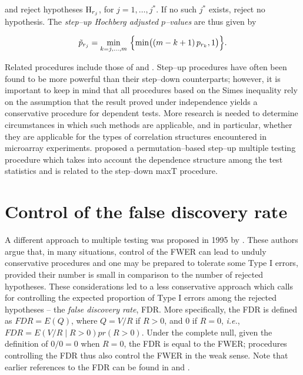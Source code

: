 \documentclass[11pt]{article}
\newcommand{\scst}{\scriptstyle}
\begin{document}
and reject hypotheses ${\rm H}_{\scst r_j}$, for $j=1,\ldots,j^*$. If no such $j^*$ exists, reject no hypothesis. The {\it step--up Hochberg adjusted $p$--values} are thus given by 

\begin{equation}\label{ehoch}
\tilde{p}_{\scst r_j} = \min_{k = j,\ldots, m}\ \Bigl\{ \min \bigl( (m-k+1) \, p_{\scst r_k},1 \bigr) \Bigr\}.
\end{equation}

Related procedures include those of \cite{Hommel88} and \cite{Rom90}. Step--up procedures have often been found to be more powerful than their step--down counterparts; however, it is important to keep in mind that all procedures based on the Simes inequality rely on the assumption that the result proved under independence yields a conservative procedure for dependent tests. More research is needed to determine circumstances in which such methods are applicable, and in particular, whether they are applicable for the types of correlation structures encountered in microarray experiments. \cite{Troendle96} proposed a permutation--based step--up multiple testing procedure which takes into account the dependence structure among the test statistics and is related to the \cite{Westfall&Young93} step--down maxT procedure.



\section{Control of the false discovery rate}\label{sFDR}

A different approach to multiple testing was proposed in 1995 by
\cite{Benjamini&Hochberg95}. These authors argue that, in many
situations, control of the FWER can lead to unduly conservative
procedures and one may be prepared to tolerate some Type I
errors, provided their number is small in comparison to the number of
rejected hypotheses. These considerations led to a less conservative
approach which calls for controlling the expected proportion of Type I
errors among the rejected hypotheses -- the {\it false discovery rate},
FDR. More specifically, the FDR is defined as $FDR = E(Q)$, where $Q =
V/R$ if $R >0$, and $0$ if $R=0$, {\it i.e.}, $FDR = E(V/R \mid
R>0)pr(R>0)$. Under the complete null, given the definition of $0/0 =
0$ when $R=0$, the FDR is equal to the FWER;  procedures
controlling the FDR thus also control the FWER in the weak sense. Note that
earlier references to the FDR can be found in \cite{Seeger68} and \cite{Soric89}.\\
\end{document}
